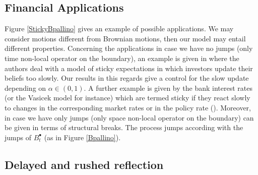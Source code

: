 \documentclass[11pt,a4paper]{article}
\theoremstyle{plain}
\theoremstyle{definition}
\theoremstyle{remark}
\begin{document}
		
		
		
		\subsection{Financial Applications}
		Figure \ref{StickyBpallino} gives an example of possible applications. We may consider motions different from Brownian motions, then our model may entail different properties. Concerning the applications in case we have no jumps (only time non-local operator on the boundary), an example is given in \cite{BKLT-financeSticky} where the authors deal with a model of sticky expectations in which investors update their beliefs too slowly. Our results in this regards give a control for the slow update depending on $\alpha \in (0,1)$. A further example is given by the bank interest rates (or the Vasicek model for instance)  which are termed sticky if they react slowly to changes in the corresponding market rates or in the policy rate (\cite{GNSS-finance-Sticky}). Moreover, in case we have only jumps (only space non-local operator on the boundary) can be given in terms of structural breaks. The process jumps according with the jumps of $B^\bullet_t$ (as in Figure \ref{Bpallino}).  
		
		
		
		\subsection{Delayed and rushed reflection}
		
\end{document}
